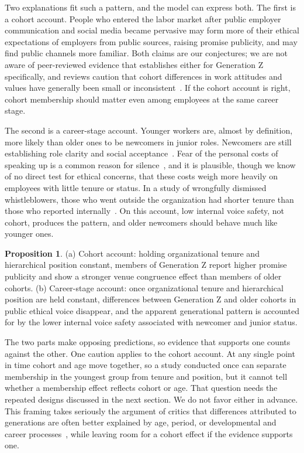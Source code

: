 \documentclass[12pt,a4paper]{article}
\theoremstyle{definition}
\newtheorem{proposition}{Proposition}
\begin{document}
Two explanations fit such a pattern, and the model can express both. The first is a cohort account. People who entered the labor market after public employer communication and social media became pervasive may form more of their ethical expectations of employers from public sources, raising promise publicity, and may find public channels more familiar. Both claims are our conjectures; we are not aware of peer-reviewed evidence that establishes either for Generation Z specifically, and reviews caution that cohort differences in work attitudes and values have generally been small or inconsistent~\citep{costanza2012generational,parry2011generational,rudolph2021generations}. If the cohort account is right, cohort membership should matter even among employees at the same career stage.

The second is a career-stage account. Younger workers are, almost by definition, more likely than older ones to be newcomers in junior roles. Newcomers are still establishing role clarity and social acceptance~\citep{bauer2007newcomer}. Fear of the personal costs of speaking up is a common reason for silence~\citep{milliken2003exploratory,kishgephart2009silenced}, and it is plausible, though we know of no direct test for ethical concerns, that these costs weigh more heavily on employees with little tenure or status. In a study of wrongfully dismissed whistleblowers, those who went outside the organization had shorter tenure than those who reported internally~\citep{dworkin1998internal}. On this account, low internal voice safety, not cohort, produces the pattern, and older newcomers should behave much like younger ones.

\begin{proposition}
(a) Cohort account: holding organizational tenure and hierarchical position constant, members of Generation Z report higher promise publicity and show a stronger venue congruence effect than members of older cohorts. (b) Career-stage account: once organizational tenure and hierarchical position are held constant, differences between Generation Z and older cohorts in public ethical voice disappear, and the apparent generational pattern is accounted for by the lower internal voice safety associated with newcomer and junior status.
\end{proposition}

The two parts make opposing predictions, so evidence that supports one counts against the other. One caution applies to the cohort account. At any single point in time cohort and age move together, so a study conducted once can separate membership in the youngest group from tenure and position, but it cannot tell whether a membership effect reflects cohort or age. That question needs the repeated designs discussed in the next section. We do not favor either in advance. This framing takes seriously the argument of critics that differences attributed to generations are often better explained by age, period, or developmental and career processes~\citep{rudolph2017considering,rudolph2021generations}, while leaving room for a cohort effect if the evidence supports one.
\end{document}
